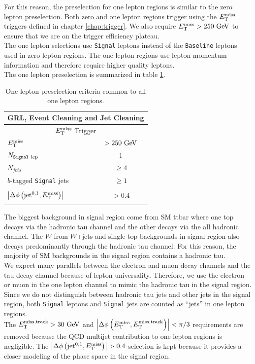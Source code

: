 \indent For this reason, the preselection for one lepton regions is similar to the zero lepton preselection.  Both zero and one lepton regions trigger using the $E_{\mathrm{T}}^{\mathrm{miss}}$ triggers defined in chapter \ref{chap:trigger}.  We also require $\met > 250 \gev$ to ensure that we are on the trigger efficiency plateau.  \\

\indent The one lepton selections use {\tt Signal} leptons instead of the {\tt Baseline} leptons used in zero lepton regions.  The one lepton regions use lepton momentum information and therefore require higher quality leptons. \\

\indent The one lepton preselection is summarized in table \ref{tab:1Lcommon}. \\

\begin{table}[htbp]
  \begin{center}
    \begin{tabular}{lc} \hline\hline
      \multicolumn{2}{c}{GRL, Event Cleaning and Jet Cleaning} \\ \hline
      \multicolumn{2}{c}{$E_{\mathrm{T}}^{\mathrm{miss}}$ Trigger} \\ \hline
      $E_{\mathrm{T}}^{\mathrm{miss}}$ & $> 250\GeV$ \\ 
      $N_{\rm{{\tt Signal}~lep}}$ & 1 \\
    $N_{jets}$ & $\ge 4$ \\ 
      $b$-tagged {\tt Signal} jets & $\ge1$ \\ 
                   & \\ [-2.5ex] 
      $\left|\Delta\phi\left(\mathrm{jet}^{0,1},E_{\mathrm{T}}^{\mathrm{miss}}\right)\right|$ & $> 0.4$ \\
             & \\ [-2.5ex] \hline
    \end{tabular}
  \caption{ One lepton preselection criteria common to all one lepton regions.}
  \label{tab:1Lcommon}
  \end{center}
\end{table}

\indent The biggest background in signal region come from SM ttbar where one top decays via the hadronic tau channel and the other decays via the all hadronic channel.  The $W$ from $W$+jets and single top backgrounds in signal region also decays predominantly through the hadronic tau channel.  For this reason, the majority of SM backgrounds in the signal region contains a hadronic tau.  \\

\indent We expect many parallels between the electron and muon decay channels and the tau decay channel because of lepton universality.  Therefore, we use the electron or muon in the one lepton channel to mimic the hadronic tau in the signal region.  Since we do not distinguish between hadronic tau jets and other jets in the signal region, both {\tt Signal} leptons and {\tt Signal} jets are counted as ``jets'' in one lepton regions. \\

\indent The $\mettrk > 30 \gev$ and $\dphimettrk < \pi/3$ requirements are removed because the QCD multijet contribution to one lepton regions is negligible.  The $\left|\Delta\phi\left(\mathrm{jet}^{0,1},E_{\mathrm{T}}^{\mathrm{miss}}\right)\right| > 0.4$ selection is kept because it provides a closer modeling of the phase space in the signal region. \\


